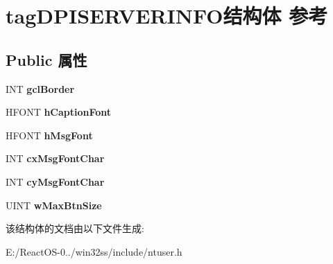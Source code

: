 \hypertarget{structtag_d_p_i_s_e_r_v_e_r_i_n_f_o}{}\section{tag\+D\+P\+I\+S\+E\+R\+V\+E\+R\+I\+N\+F\+O结构体 参考}
\label{structtag_d_p_i_s_e_r_v_e_r_i_n_f_o}
\subsection*{Public 属性}
\begin{DoxyCompactItemize}
\item 
\mbox{\label{structtag_d_p_i_s_e_r_v_e_r_i_n_f_o_a6c9dae803f731001b9376403d1a9e2b2}} 
I\+NT {\bfseries gcl\+Border}
\item 
\mbox{\label{structtag_d_p_i_s_e_r_v_e_r_i_n_f_o_a22b18f06fb4796820ab157481a546833}} 
H\+F\+O\+NT {\bfseries h\+Caption\+Font}
\item 
\mbox{\label{structtag_d_p_i_s_e_r_v_e_r_i_n_f_o_a53193a547f7192729dabd4b3d43cfe99}} 
H\+F\+O\+NT {\bfseries h\+Msg\+Font}
\item 
\mbox{\label{structtag_d_p_i_s_e_r_v_e_r_i_n_f_o_a7eefbce2c8f9891c521e48f54d7be26d}} 
I\+NT {\bfseries cx\+Msg\+Font\+Char}
\item 
\mbox{\label{structtag_d_p_i_s_e_r_v_e_r_i_n_f_o_a06a533c7052760381459ab58d5af2db5}} 
I\+NT {\bfseries cy\+Msg\+Font\+Char}
\item 
\mbox{\label{structtag_d_p_i_s_e_r_v_e_r_i_n_f_o_a2a22c7192fb747072f00016e89c43718}} 
U\+I\+NT {\bfseries w\+Max\+Btn\+Size}
\end{DoxyCompactItemize}


该结构体的文档由以下文件生成\+:\begin{DoxyCompactItemize}
\item 
E\+:/\+React\+O\+S-\/0../win32ss/include/ntuser.\+h\end{DoxyCompactItemize}
